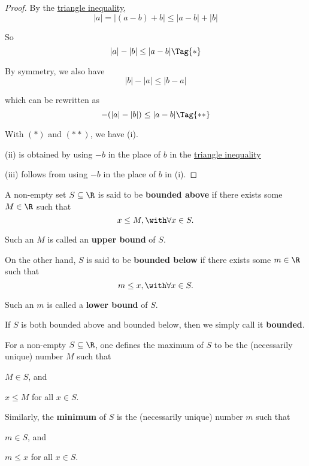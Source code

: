 \begin{proof}
  By the \href{f1288ad}{triangle inequality},
  $$
    |a|=|(a-b)+b|\leq|a-b|+|b|
  $$

  So
  \begin{equation*}
    |a|-|b|\leq|a-b|\Tag{*}
  \end{equation*}

  By symmetry, we also have
  $$
    |b|-|a|\leq|b-a|
  $$

  which can be rewritten as
  \begin{equation*}
    -(|a|-|b|)\leq|a-b|\Tag{**}
  \end{equation*}

  With $(*)$ and $(**)$, we have (i).

  (ii) is obtained by using ${-}b$ in the place of $b$ in the
  \href{f1288ad}{triangle inequality}

  (iii) follows from using ${-}b$ in the place of $b$ in (i).
\end{proof}

\label{e4698be}

A non-empty set $S\subseteq\R$ is said to be \textbf{bounded above} if there
exists some $M\in\R$ such that
$$
  x\leq M,\with\forall x\in S.
$$

Such an $M$ is called an \textbf{upper bound} of $S$.

On the other hand, $S$ is said to be \textbf{bounded below} if there exists
some $m\in\R$ such that
$$
  m\leq x,\with\forall x\in S.
$$

Such an $m$ is called a \textbf{lower bound} of $S$.

If $S$ is both bounded above and bounded below, then we simply call it
\textbf{bounded}.

\label{c3ec51c}

For a non-empty $S\subseteq\R$, one defines the maximum of $S$ to be the
(necessarily unique) number $M$ such that
\begin{enumerati}
  \item $M\in S$, and
  \item $x\leq M$ for all $x\in S$.
\end{enumerati}

Similarly, the \textbf{minimum} of $S$ is the (necessarily unique) number $m$
such that
\begin{enumerati}
  \item $m\in S$, and
  \item $m\leq x$ for all $x\in S$.
\end{enumerati}

